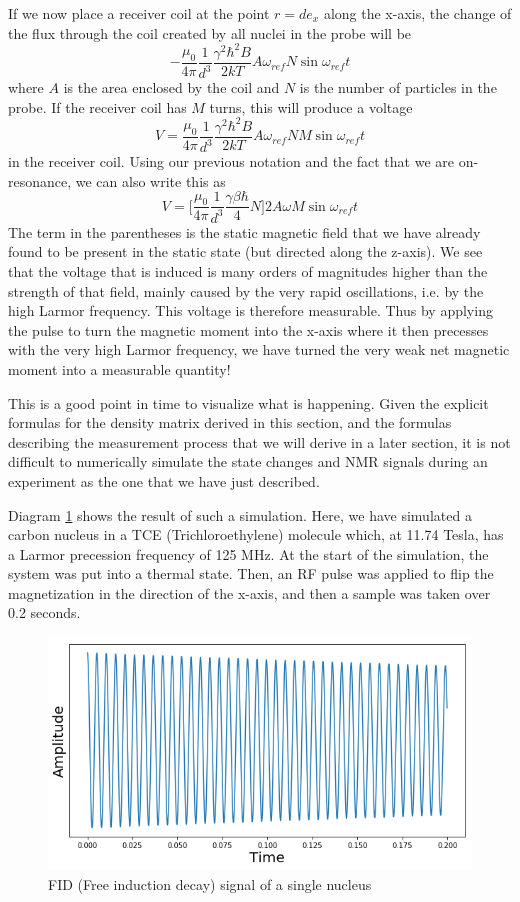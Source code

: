 \documentclass[a4paper, draft]{article}
\theoremstyle{own}
\theoremstyle{remark}
\begin{document}
If we now place a receiver coil at the point $r = d e_x$ along the x-axis, the change of the flux through the coil created by all nuclei in the probe will be
$$
- \frac{\mu_0}{4\pi} \frac{1}{d^3} 
\frac{\gamma^2 \hbar^2 B}{2kT}
A \omega_{ref} N \sin \omega_{ref} t
$$
where $A$ is the area enclosed by the coil and $N$ is the number of particles in the probe. If the receiver coil has $M$ turns, this will produce a voltage
$$
V = \frac{\mu_0}{4\pi} \frac{1}{d^3} 
\frac{\gamma^2 \hbar^2 B}{2kT}
A \omega_{ref} N M \sin \omega_{ref} t
$$
in the receiver coil. Using our previous notation and the fact that we are on-resonance, we can also write this as
$$
V = \big[ \frac{\mu_0}{4\pi} \frac{1}{d^3}  \frac{\gamma \beta \hbar}{4} N \big]  2 A \omega  M \sin \omega_{ref} t
$$
The term in the parentheses is the static magnetic field that we have already found to be present in the static state (but directed along the z-axis). We see that the voltage that is induced is many orders of magnitudes higher than the strength of that field, mainly caused by the very rapid oscillations, i.e. by the high Larmor frequency. This voltage is therefore measurable. Thus by applying the pulse to turn the magnetic moment into the x-axis where it then precesses with the very high Larmor frequency, we have turned the very weak net magnetic moment into a measurable quantity! 

This is a good point in time to visualize what is happening. Given the explicit formulas for the density matrix derived in this section, and the formulas describing the measurement process that we will derive in a later section, it is not difficult to numerically simulate the state changes and NMR signals during an experiment as the one that we have just described. 

Diagram \ref{fig:SingleNucleusNMRSignal} shows the result of such a simulation. Here, we have simulated a carbon nucleus in a TCE (Trichloroethylene) molecule which, at 11.74 Tesla, has a Larmor precession frequency of 125 MHz. At the start of the simulation, the system was put into a thermal state. Then, an RF pulse was applied to flip the magnetization in the direction of the x-axis, and then a sample was taken over 0.2 seconds.

\begin{figure}[ht]
\centering
\includegraphics[width=0.9\linewidth]{images/SingleNucleusNMRSignal}
\caption[FID (Free induction decay) signal of a single nucleus]{FID (Free induction decay) signal of a single nucleus}
\label{fig:SingleNucleusNMRSignal}
\end{figure}
\end{document}
